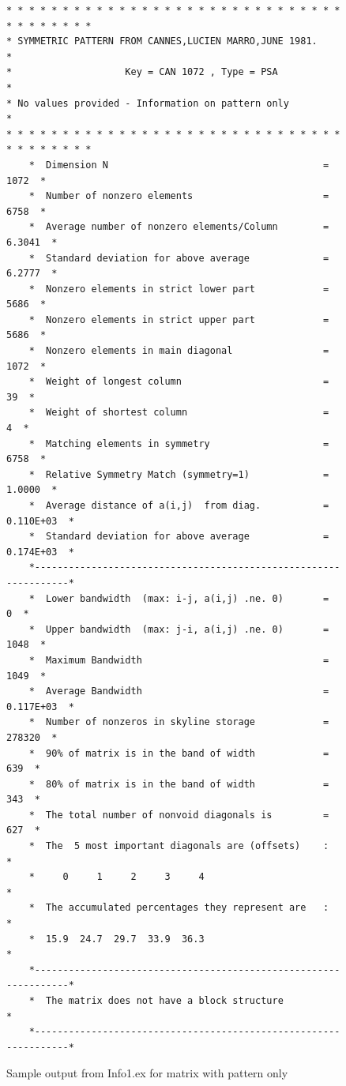 \documentclass[12pt]{article}
\begin{document}
\begin{figure}
\begin{verbatim}
* * * * * * * * * * * * * * * * * * * * * * * * * * * * * * * * * * * * * *
* SYMMETRIC PATTERN FROM CANNES,LUCIEN MARRO,JUNE 1981.                   *
*                    Key = CAN 1072 , Type = PSA                          *
* No values provided - Information on pattern only                        *
* * * * * * * * * * * * * * * * * * * * * * * * * * * * * * * * * * * * * *
    *  Dimension N                                      =       1072  *
    *  Number of nonzero elements                       =       6758  *
    *  Average number of nonzero elements/Column        =     6.3041  *
    *  Standard deviation for above average             =     6.2777  *
    *  Nonzero elements in strict lower part            =       5686  *
    *  Nonzero elements in strict upper part            =       5686  *
    *  Nonzero elements in main diagonal                =       1072  *
    *  Weight of longest column                         =         39  *
    *  Weight of shortest column                        =          4  *
    *  Matching elements in symmetry                    =       6758  *
    *  Relative Symmetry Match (symmetry=1)             =     1.0000  *
    *  Average distance of a(i,j)  from diag.           =  0.110E+03  *
    *  Standard deviation for above average             =  0.174E+03  *
    *-----------------------------------------------------------------*
    *  Lower bandwidth  (max: i-j, a(i,j) .ne. 0)       =          0  *
    *  Upper bandwidth  (max: j-i, a(i,j) .ne. 0)       =       1048  *
    *  Maximum Bandwidth                                =       1049  *
    *  Average Bandwidth                                =  0.117E+03  *
    *  Number of nonzeros in skyline storage            =     278320  *
    *  90% of matrix is in the band of width            =        639  *
    *  80% of matrix is in the band of width            =        343  *
    *  The total number of nonvoid diagonals is         =        627  *
    *  The  5 most important diagonals are (offsets)    :             *
    *     0     1     2     3     4                                   *
    *  The accumulated percentages they represent are   :             *
    *  15.9  24.7  29.7  33.9  36.3                                   *
    *-----------------------------------------------------------------*
    *  The matrix does not have a block structure                     *
    *-----------------------------------------------------------------*
\end{verbatim}
\caption{Sample output from Info1.ex for matrix with pattern only \label{Fig2}}
\end{figure}
\end{document}
